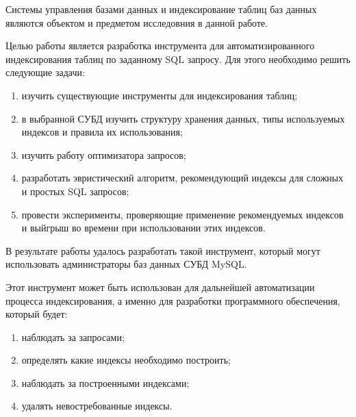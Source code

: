 \abstract

Системы управления базами данных и индексирование таблиц баз данных являются объектом и предметом исследовния в данной работе.  

Целью работы является разработка инструмента для автоматизированного индексирования таблиц по заданному SQL запросу. Для этого необходимо решить следующие задачи:

\begin{enumerate}
\item изучить существующие инструменты для индексирования таблиц;
\item в выбранной СУБД изучить структуру хранения данных, типы используемых индексов и правила их использования;
\item изучить работу оптимизатора запросов;
\item разработать эвристический алгоритм, рекомендующий индексы для сложных и простых SQL запросов;
\item провести эксперименты, проверяющие применение рекомендуемых индексов и выйгрыш во времени при использовании этих индексов.
\end{enumerate}

В результате работы удалось разработать такой инструмент, который могут использовать администраторы баз данных СУБД MySQL. 

Этот инструмент может быть использован для дальнейшей автоматизации процесса индексирования, а именно для разработки программного обеспечения, который будет:
\begin{enumerate}
\item наблюдать за запросами;
\item определять какие индексы необходимо построить;
\item наблюдать за построенными индексами;
\item удалять невостребованные индексы.
\end{enumerate}